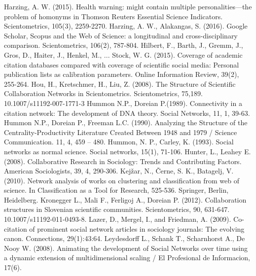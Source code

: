 \documentclass[11pt]{article} %
\begin{document}
\begin{thebibliography}{99}
   Harzing, A. W. (2015). Health warning: might contain multiple personalities—the problem of homonyms in Thomson Reuters Essential Science Indicators. Scientometrics, 105(3), 2259-2270.
   Harzing, A. W., Alakangas, S. (2016). Google Scholar, Scopus and the Web of Science: a longitudinal and cross-disciplinary comparison. Scientometrics, 106(2), 787-804.
   Hilbert, F., Barth, J., Gremm, J., Gros, D., Haiter, J., Henkel, M., ... Stock, W. G. (2015). Coverage of academic citation databases compared with coverage of scientific social media: Personal publication lists as calibration parameters. Online Information Review, 39(2), 255-264.
   Hou, H., Kretschmer, H., Liu, Z. (2008). The Structure of Scientific Collaboration Networks in Scientometrics. Scientometrics, 75,189. 10.1007/s11192-007-1771-3 
   Hummon N.P., Doreian P.(1989). Connectivity in a citation network: The development of DNA theory. Social Networks, 11, 1, 39-63. 
   Hummon N.P., Doreian P., Freeman L.C. (1990). Analyzing the Structure of the Centrality-Productivity Literature Created Between 1948 and 1979 / Science Communication. 11, 4, 459 – 480. 
   Hummon, N. P., Carley, K. (1993). Social networks as normal science. Social networks, 15(1), 71-106.
   Hunter, L., Leahey E. (2008). Collaborative Research in Sociology: Trends and Contributing Factors. American Sociologists, 39, 4, 290-306. 
Kejžar, N., Černe, S. K., Batagelj, V. (2010). Network analysis of works on clustering and classification from web of science. In Classification as a Tool for Research, 525-536. Springer, Berlin, Heidelberg.
   Kronegger L., Mali F., Ferligoj A., Doreian P. (2012). Collaboration structures in Slovenian scientific communities. Scientometrics, 90, 631-647. 10.1007/s11192-011-0493-8. 
   Lazer, D., Mergel, I., and Friedman, A. (2009). Co-citation of prominent social network articles in sociology journals: The evolving canon. Connections, 29(1):43:64. 
   Leydesdorff L., Schank T., Scharnhorst A., De Nooy W. (2008). Animating the development of Social Networks over time using a dynamic extension of multidimensional scaling / El Profesional de Informacion, 17(6).

\end{thebibliography}
\end{document}

